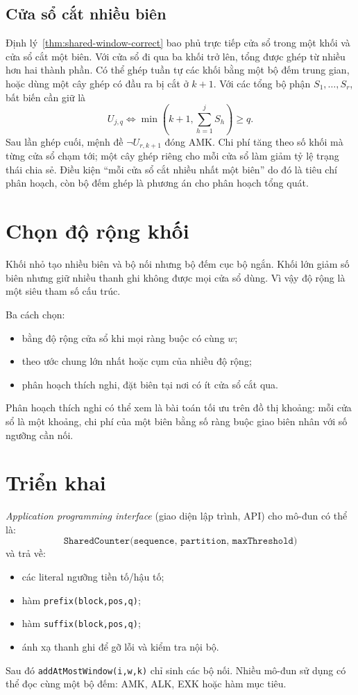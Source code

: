 \subsection{Cửa sổ cắt nhiều biên}

Định lý~\ref{thm:shared-window-correct} bao phủ trực tiếp cửa sổ trong một khối
và cửa sổ cắt một biên. Với cửa sổ đi qua ba khối trở lên, tổng được ghép từ
nhiều hơn hai thành phần.
Có thể ghép tuần tự các khối bằng một bộ đếm trung gian, hoặc dùng một cây ghép
có đầu ra bị cắt ở \(k+1\). Với các tổng bộ phận
\(S_1,\ldots,S_r\), bất biến cần giữ là
\[
  U_{j,q}\iff \min\!\left(k+1,\sum_{h=1}^{j}S_h\right)\ge q .
\]
Sau lần ghép cuối, mệnh đề \(\neg U_{r,k+1}\) đóng AMK. Chi phí tăng theo số
khối mà từng cửa sổ chạm tới; một cây ghép riêng cho mỗi cửa sổ làm giảm tỷ
lệ trạng thái chia sẻ. Điều kiện ``mỗi cửa sổ cắt nhiều nhất một biên'' do
đó là tiêu chí phân hoạch, còn bộ đếm ghép là phương án cho phân hoạch tổng
quát.

\section{Chọn độ rộng khối}

Khối nhỏ tạo nhiều biên và bộ nối nhưng bộ đếm cục bộ ngắn. Khối lớn giảm số
biên nhưng giữ nhiều thanh ghi không được mọi cửa sổ dùng. Vì vậy độ rộng là
một siêu tham số cấu trúc.

Ba cách chọn:
\begin{itemize}
  \item bằng độ rộng cửa sổ khi mọi ràng buộc có cùng \(w\);
  \item theo ước chung lớn nhất hoặc cụm của nhiều độ rộng;
  \item phân hoạch thích nghi, đặt biên tại nơi có ít cửa sổ cắt qua.
\end{itemize}

Phân hoạch thích nghi có thể xem là bài toán tối ưu trên đồ thị khoảng: mỗi cửa
sổ là một khoảng, chi phí của một biên bằng số ràng buộc giao biên nhân với số
ngưỡng cần nối.

\section{Triển khai}

\emph{Application programming interface} (giao diện lập trình, API) cho
mô-đun có thể là:
\[
  \texttt{SharedCounter(sequence, partition, maxThreshold)}
\]
và trả về:
\begin{itemize}
  \item các literal ngưỡng tiền tố/hậu tố;
  \item hàm \texttt{prefix(block,pos,q)};
  \item hàm \texttt{suffix(block,pos,q)};
  \item ánh xạ thanh ghi để gỡ lỗi và kiểm tra nội bộ.
\end{itemize}
Sau đó \texttt{addAtMostWindow(i,w,k)} chỉ sinh các bộ nối. Nhiều mô-đun sử
dụng có thể đọc cùng một bộ đếm: AMK, ALK, EXK hoặc hàm mục tiêu.


